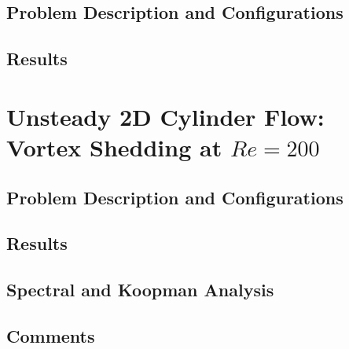     \subsection{Problem Description and Configurations}
    \label{sec:pinn-2d-cylinder-re40-conf}
    

    \subsection{Results}
    \label{sec:pinn-2d-cylinder-re40-results}
    

\section{Unsteady 2D Cylinder Flow: Vortex Shedding at \texorpdfstring{$Re=200$}{re200}}
\label{sec:pinn-2d-cylinder-re200}

    \subsection{Problem Description and Configurations}
    \label{sec:pinn-2d-cylinder-re200-conf}
    

    \subsection{Results}
    \label{sec:pinn-2d-cylinder-re200-results}
    

    \subsection{Spectral and Koopman Analysis}
    \label{sec:pinn-2d-cylinder-re200-koopman}
    

    \subsection{Comments}
    \label{sec:pinn-2d-cylinder-re200-comment}
    
